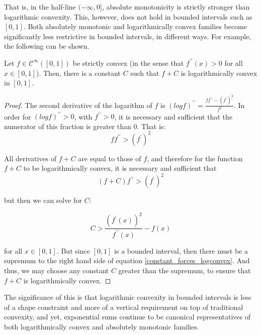 \documentclass[12pt,a4paper]{article}
\newcommand{\cinfty} {\mathcal{C}^{\infty}}
\begin{document}
That is, in the half-line $(-\infty,0]$, absolute monotonicity is strictly stronger than logarithmic convexity. This, however, does not hold in bounded intervals such as $[0,1]$. Both absolutely monotonic and logarithmically convex families become significantly less restrictive in bounded intervals, in different ways. For example, the following can be shown.

\begin{lemma}
Let $f \in \cinfty([0,1])$ be strictly convex (in the sense that $f^{\prime\prime}(x) > 0$ for all $x \in [0,1]$).
Then, there is a constant $C$ such that $f + C$ is logarithmically convex in $[0,1]$.
\end{lemma}

\begin{proof}
The second derivative of the logarithm of $f$ is $(log f)^{\prime\prime} = \frac{f f^{\prime\prime} - (f^{\prime})^2}{f^2}$. In order for $(log f)^{\prime \prime} > 0$, with $f^{\prime \prime} > 0$, it is necessary and sufficient that the numerator of this fraction is greater than $0$. That is:
\begin{equation}
f f^{\prime\prime} > (f^{\prime})^2
\end{equation}

All derivatives of $f+C$ are equal to those of $f$, and therefore for the function $f+C$ to be logarithmically convex, it is necessary and sufficient that
\begin{equation}
(f + C) f^{\prime\prime} > (f^{\prime})^2
\end{equation}

but then we can solve for $C$:

\begin{equation}
\label{constant_forces_logconvex}
C > \frac{(f^{\prime}(x))^2}{f^{\prime\prime}(x)} - f(x)
\end{equation}

for all $x \in [0,1]$. But since $[0,1]$ is a bounded interval, then there must be a supremum to the right hand side of equation \ref{constant_forces_logconvex}. And thus, we may choose any constant $C$ greater than the supremum, to ensure that $f + C$ is logarithmically convex.
\end{proof}

The significance of this is that logarithmic convexity in bounded intervals is less of a shape constraint and more of a vertical requirement on top of traditional convexity, and yet, exponential sums continue to be canonical representatives of both logarithmically convex and absolutely monotonic families.\\
\end{document}
